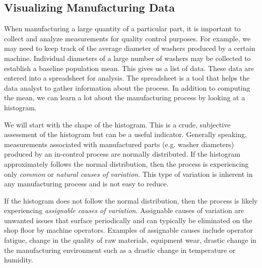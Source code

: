 \documentclass{ximera}
\begin{document}
\subsection*{Visualizing Manufacturing Data}

When manufacturing a large quantity of a particular part, it is important to collect and analyze measurements for quality control purposes.  For example, we may need to keep track of the average diameter of washers produced by a certain machine.  Individual diameters of a large number of washers may be collected to establish a baseline population mean.  This gives us a list of data.  These data are entered into a spreadsheet for analysis. The spreadsheet is a tool that helps the data analyst to gather information about the process. In addition to computing the mean, we can learn a lot about the manufacturing process by looking at a histogram.  

We will start with the shape of the histogram.  This is a crude, subjective assessment of the histogram but can be a useful indicator.  Generally speaking, measurements associated with manufactured parts (e.g. washer diameters) produced by an in-control process are normally distributed.  If the histogram approximately follows the normal distribution, then the process is experiencing only \emph{common} or \emph{natural causes of variation}. This type of variation is inherent in any manufacturing process and is not easy to reduce.  

If the histogram does not follow the normal distribution, then the process is likely experiencing \emph{assignable causes of variation}.  Assignable causes of variation are unwanted issues that surface periodically and can typically be eliminated on the shop floor by machine operators.  Examples of assignable causes include operator fatigue, change in the quality of raw materials, equipment wear, drastic change in the manufacturing environment such as a drastic change in temperature or humidity.
\end{document}
